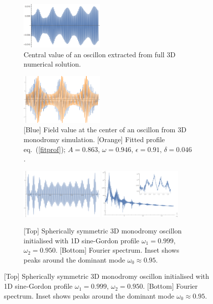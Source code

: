 \documentclass[%
reprint,
superscriptaddress,
amsmath,amssymb,
aps,
prd,
floatfix,
nofootinbib
]{revtex4-1}
\begin{document}
\begin{figure}
\begin{figure}
  \centering
  \includegraphics[width=0.45\textwidth]{plot/3Doscillon.png} 
    \caption{Central value of an oscillon extracted from full 3D numerical solution.}
  \label{raw}
\end{figure}

\begin{figure}
  \centering
  \includegraphics[width=0.45\textwidth]{plot/simul-profile.png}
  \caption{[Blue] Field value at the center of an oscillon from 3D monodromy simulation. [Orange] Fitted profile eq.~(\ref{fitprof}); $A=0.863$, $\omega=0.946$, $\epsilon=0.91$,  $\delta=0.046$.}\label{simul-prof}
\end{figure}

\begin{figure}
  \centering
  \includegraphics[width=0.45\textwidth]{plot/profile-3scale.png}
  \includegraphics[width=0.45\textwidth]{plot/fourier.png}
  \caption{[Top] Spherically symmetric 3D monodromy oscillon initialised with 1D
    sine-Gordon profile $\omega_1=0.999$, $\omega_2=0.950$.  [Bottom] Fourier spectrum. Inset shows  peaks around the dominant mode $\omega_0\approx0.95$.}\label{fourier}
\end{figure}
 

\end{figure}
\end{document}
